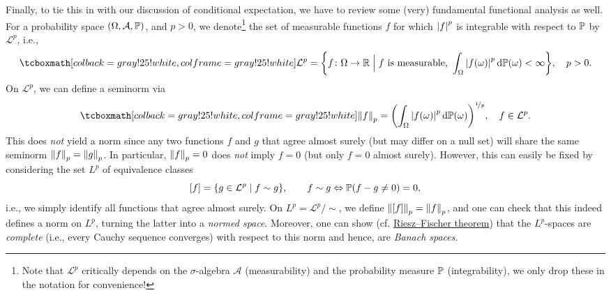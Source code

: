 Finally, to tie this in with our discussion of conditional expectation, we have to review some (very) fundamental functional analysis as well. For a probability space $(\Omega, \mathcal{A}, \P)$, and $p > 0$, we denote\footnote{Note that $\mathcal{L}^p$ critically depends on the $\sigma$-algebra $\mathcal{A}$ (measurability) and the probability measure $\P$ (integrability), we only drop these in the notation for convenience!} the set of measurable functions $f$ for which $\abs{f}^p$ is integrable with respect to $\P$ by $\mathcal{L}^p$, i.e.,
\[
    \highlightMath{
        \mathcal{L}^p = \set{f \colon \Omega \to \R \with[\Big] f \text{ is measurable, } \int_{\Omega} \abs{f(\omega)}^p \dP(\omega) < \infty}, \quad p > 0.
    }
\]
On $\mathcal{L}^p$, we can define a seminorm via
\[
    \highlightMath{
        \norm{f}_p = \left( \int_{\Omega} \abs{f(\omega)}^p \dP(\omega) \right)^{\nicefrac{1}{p}}, \quad f \in \mathcal{L}^p.
    }
\]
This does \emph{not} yield a  norm since any two functions $f$ and $g$ that agree almost surely (but may differ on a null set) will share the same seminorm $\norm{f}_p = \norm{g}_p$. In particular, $\norm{f}_p = 0$ does \emph{not} imply $f = 0$ (but only $f = 0$ almost surely). However, this can easily be fixed by considering the set $L^p$ of equivalence classes
\[
    [f] = \set{g \in \mathcal{L}^p \with f \sim g}, \qquad f \sim g \Leftrightarrow \Prob(f - g \neq 0) = 0,
\]
i.e., we simply identify all functions that agree almost surely. On $L^p = \mathcal{L}^p / {\sim}$, we define $\norm{[f]}_p = \norm{f}_p$, and one can check that this indeed defines a norm on $L^p$, turning the latter into a \emph{normed space}. Moreover, one can show (cf. \href{https://en.wikipedia.org/wiki/Riesz–Fischer_theorem#Completeness_of_Lp,_0_%3C_p_≤_∞}{Riesz–Fischer theorem}) that the $L^p$-spaces are \emph{complete} (i.e., every Cauchy sequence converges) with respect to this norm and hence, are \emph{Banach spaces}.

